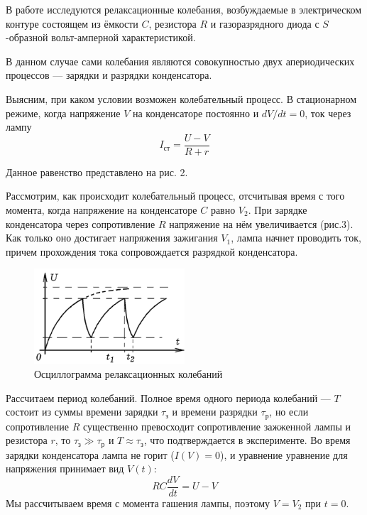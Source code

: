 \documentclass[a4paper, 12pt]{article}%
\begin{document}
В работе исследуются релаксационные колебания, возбуждаемые в электрическом контуре состоящем из ёмкости $C$, резистора $R$ и газоразрядного диода с $S$-образной вольт-амперной характеристикой. 

В данном случае сами колебания являются совокупностью двух апериодических процессов --- зарядки и разрядки конденсатора. 

Выясним, при каком условии возможен колебательный процесс. В стационарном режиме, когда напряжение $V$ на конденсаторе постоянно и $dV/dt = 0$, ток через лампу
\begin{equation}
I_{\text{ст}} = \dfrac{U - V}{R+r}
\end{equation}

Данное равенство представлено на рис. 2.

Рассмотрим, как происходит колебательный процесс, отсчитывая время с того момента, когда напряжение на конденсаторе $C$ равно $V_2$. При зарядке конденсатора через сопротивление $R$ напряжение на нём увеличивается (рис.3). Как только оно достигает напряжения зажигания $V_1$, лампа начнет проводить ток, причем прохождения тока сопровождается разрядкой конденсатора. 

\begin{figure}[h]
\begin{center}
\includegraphics[width = 0.5\textwidth]{4.png}
\caption{Осциллограмма релаксационных колебаний}
\end{center}
\end{figure}

Рассчитаем период колебаний. Полное время одного периода колебаний --- $T$ состоит из суммы времени зарядки $\tau_{\text{з}}$ и времени разрядки $\tau_{\text{р}}$, но если сопротивление $R$ существенно превосходит сопротивление зажженной лампы и резистора $r$, то $\tau_{\text{з}} \gg \tau_{\text{р}}$ и $T \approx \tau_{\text{з}}$, что подтверждается в эксперименте. Во время зарядки конденсатора лампа не горит ($I(V) = 0$), и уравнение уравнение для напряжения принимает вид $V(t)$:
\begin{equation}
RC\dfrac{dV}{dt} = U-V
\end{equation}
Мы рассчитываем время с момента гашения лампы, поэтому $V = V_2$ при $t=0$.
\end{document}
